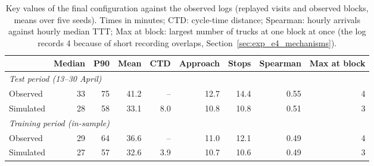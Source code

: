 \begin{table}[htbp]
\centering
\small
\begin{tabular}{lrrrrrrrr}
\toprule
& \textbf{Median} & \textbf{P90} & \textbf{Mean} & \textbf{CTD} & \textbf{Approach} & \textbf{Stops} & \textbf{Spearman} & \textbf{Max at block} \\
\midrule
\multicolumn{9}{l}{\textit{Test period (13--30 April)}} \\
Observed & 33 & 75 & 41.2 & -- & 12.7 & 14.4 & 0.55 & 4 \\
Simulated & 28 & 58 & 33.1 & 8.0 & 10.8 & 10.8 & 0.51 & 3 \\
\midrule
\multicolumn{9}{l}{\textit{Training period (in-sample)}} \\
Observed & 29 & 64 & 36.6 & -- & 11.0 & 12.1 & 0.49 & 4 \\
Simulated & 27 & 57 & 32.6 & 3.9 & 10.7 & 10.6 & 0.49 & 3 \\
\bottomrule
\end{tabular}
\caption{Key values of the final configuration against the observed logs (replayed visits and observed blocks, means over five seeds). Times in minutes; CTD: cycle-time distance; Spearman: hourly arrivals against hourly median TTT; Max at block: largest number of trucks at one block at once (the log records 4 because of short recording overlaps, Section~\ref{sec:exp_e4_mechanisms}).}
\label{tab:sim_kpis}
\end{table}

